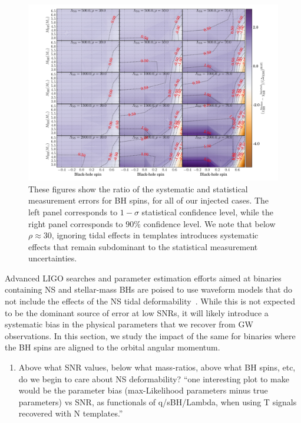 \documentclass[aps,prd,amsmath,floats,floatfix, twocolumn,
superscriptaddress,nofootinbib,showpacs]{revtex4-1}
\begin{document}
\begin{figure}
\centering
\includegraphics[trim={1.3cm 0 0 0},width=2.\columnwidth]{plots/TNChiBHBiasesOverCIWidths_CI90_0_Lambda_SNR_linear}
\caption{These figures show the ratio of the systematic and statistical
measurement errors for BH spins, for all of our injected cases. The left
panel corresponds to $1-\sigma$ statistical confidence level, while the right panel
corresponds to $90\%$ confidence level. We note that below $\rho\approx 30$, ignoring
tidal effects in templates introduces systematic effects that remain subdominant
to the statistical measurement uncertainties.
}
\label{fig:TNT_BHspinBias_vs_SNR_q23}
\end{figure}
% 
% 
Advanced LIGO searches and parameter estimation efforts aimed at binaries 
containing NS and stellar-mass BHs are poised to use waveform models that do not
include the effects of the NS tidal deformability~\cite{Canton:2014ena}.
While this is not expected to
be the dominant source of error at low SNRs, it will likely introduce a
systematic bias in the physical parameters that we recover from GW observations.
In this section, we study the impact of the same for binaries where the BH spins
are aligned to the orbital angular momentum.

\begin{enumerate}
\item Above what SNR values, below what mass-ratios, above what BH spins, etc, 
do we begin to care about NS deformability?\newline
``one interesting plot to make would be the parameter bias (max-Likelihood
parameters minus true parameters) vs SNR, as functionals of q/sBH/Lambda, when
using T signals recovered with N templates.''\newline
\end{enumerate}
\end{document}
